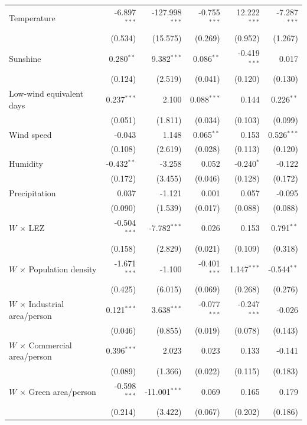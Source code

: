\begin{longtable}{lrrrrr}
\addlinespace[1pt]
Temperature & -6.897$^{***}$ & -127.998$^{***}$ & -0.755$^{***}$ & 12.222$^{***}$ & -7.287$^{***}$ \\
 & (0.534) & (15.575) & (0.269) & (0.952) & (1.267) \\
\addlinespace[1pt]
Sunshine & 0.280$^{**}$ & 9.382$^{***}$ & 0.086$^{**}$ & -0.419$^{***}$ & 0.017 \\
 & (0.124) & (2.519) & (0.041) & (0.120) & (0.130) \\
\addlinespace[1pt]
Low-wind equivalent days & 0.237$^{***}$ & 2.100 & 0.088$^{***}$ & 0.144 & 0.226$^{**}$ \\
 & (0.051) & (1.811) & (0.034) & (0.103) & (0.099) \\
\addlinespace[1pt]
Wind speed & -0.043 & 1.148 & 0.065$^{**}$ & 0.153 & 0.526$^{***}$ \\
 & (0.108) & (2.619) & (0.028) & (0.113) & (0.120) \\
\addlinespace[1pt]
Humidity & -0.432$^{**}$ & -3.258 & 0.052 & -0.240$^{*}$ & -0.122 \\
 & (0.172) & (3.455) & (0.046) & (0.128) & (0.172) \\
\addlinespace[1pt]
Precipitation & 0.037 & -1.121 & 0.001 & 0.057 & -0.095 \\
 & (0.090) & (1.539) & (0.017) & (0.088) & (0.088) \\
\addlinespace[1pt]
$W$ $\times$ LEZ & -0.504$^{***}$ & -7.782$^{***}$ & 0.026 & 0.153 & 0.791$^{**}$ \\
 & (0.158) & (2.829) & (0.021) & (0.109) & (0.318) \\
\addlinespace[1pt]
$W$ $\times$ Population density & -1.671$^{***}$ & -1.100 & -0.401$^{***}$ & 1.147$^{***}$ & -0.544$^{**}$ \\
 & (0.425) & (6.015) & (0.069) & (0.268) & (0.276) \\
\addlinespace[1pt]
$W$ $\times$ Industrial area/person & 0.121$^{***}$ & 3.638$^{***}$ & -0.077$^{***}$ & -0.247$^{***}$ & -0.026 \\
 & (0.046) & (0.855) & (0.019) & (0.078) & (0.143) \\
\addlinespace[1pt]
$W$ $\times$ Commercial area/person & 0.396$^{***}$ & 2.023 & 0.023 & 0.133 & -0.141 \\
 & (0.089) & (1.366) & (0.022) & (0.115) & (0.183) \\
\addlinespace[1pt]
$W$ $\times$ Green area/person & -0.598$^{***}$ & -11.001$^{***}$ & 0.069 & 0.165 & 0.179 \\
 & (0.214) & (3.422) & (0.067) & (0.202) & (0.186) \\

\end{longtable}
